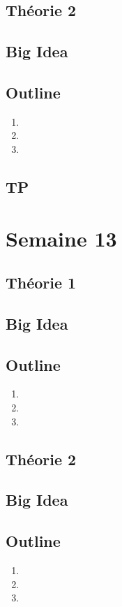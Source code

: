 \documentclass{article}
\begin{document}
\subsection{Théorie 2}
\subsection*{Big Idea}
\subsection*{Outline}
\begin{enumerate}
    \item
    \item
    \item
\end{enumerate}
\subsection{TP}

\pagebreak
\section{Semaine 13}
\subsection{Théorie 1}
\subsection*{Big Idea}
\subsection*{Outline}
\begin{enumerate}
    \item
    \item
    \item
\end{enumerate}
\subsection{Théorie 2}
\subsection*{Big Idea}
\subsection*{Outline}
\begin{enumerate}
    \item
    \item
    \item
\end{enumerate}
\end{document}
